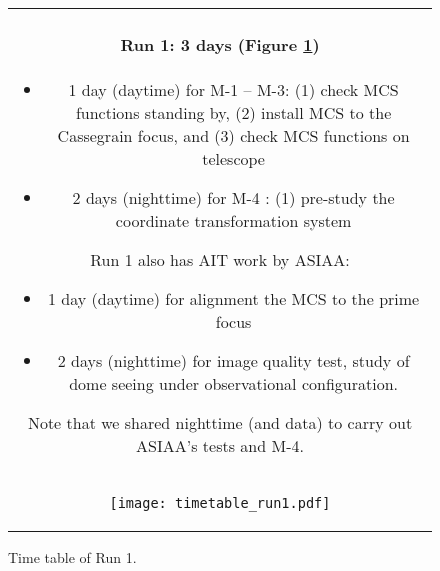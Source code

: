 \begin{figure}[!ht]
\begin{center}
\begin{tabular}{c}
\begin{minipage}{0.95\hsize}
\paragraph{Run 1: 3 days (Figure \ref{fig:run1})}
	\begin{itemize}
 	\item 1 day (daytime) for M-1 --  M-3: 
	(1) check MCS functions standing by,
	(2) install MCS to the Cassegrain focus, and
	(3) check MCS functions on telescope
 	\item 2 days (nighttime) for M-4 : 
	(1) pre-study the coordinate transformation system
	\end{itemize}
Run 1 also has AIT work by ASIAA:
	\begin{itemize}
 	\item 1 day (daytime) for alignment the MCS to the prime focus
 	\item 2 days (nighttime) for image quality test, study of dome seeing under observational configuration.
	\end{itemize}
Note that we shared nighttime (and data) to carry out ASIAA's tests and M-4.
\end{minipage} \\
\begin{minipage}{0.8\hsize}
	\begin{center}
	\vspace*{5mm}
	\texttt{[image: timetable\_run1.pdf]}
	\end{center}
	\vspace*{-5mm}
	\caption{Time table of Run 1.}
	\label{fig:run1}
\end{minipage}
\end{tabular}
\end{center}
\end{figure}

